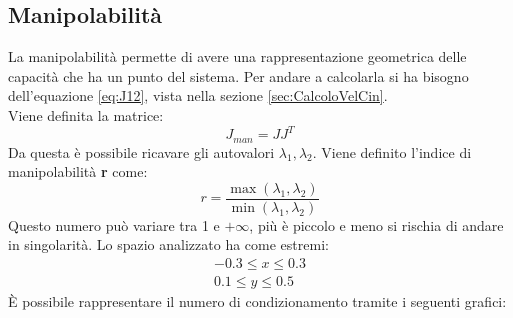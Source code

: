 \subsection{Manipolabilità}
La manipolabilità permette di avere una rappresentazione geometrica delle capacità che ha un punto del sistema. Per andare a calcolarla si ha bisogno dell'equazione \ref{eq:J12}, vista nella sezione \ref{sec:CalcoloVelCin}.
\\Viene definita la matrice:
\begin{equation}
    J_{man} = JJ^T
\end{equation}
Da questa è possibile ricavare gli autovalori $\lambda_1, \lambda_2$. Viene definito l'indice di manipolabilità \textbf{r} come:
\begin{equation}
    r = \frac{\max(\lambda_1,\lambda_2)}{\min(\lambda_1,\lambda_2)}
\end{equation}
Questo numero può variare tra 1 e $+\infty$, più è piccolo e meno si rischia di andare in singolarità. Lo spazio analizzato ha come estremi:
\begin{equation*}
	\begin{split}
		-0.3 \le x \le 0.3 \\
		0.1 \le y \le 0.5
	\end{split}
\end{equation*} 
È possibile rappresentare il numero di condizionamento tramite i seguenti grafici: 

